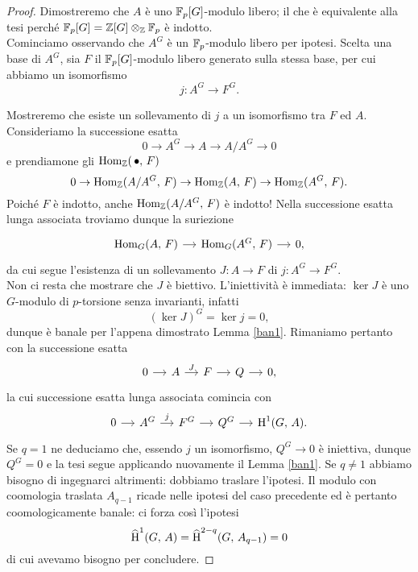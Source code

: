 \begin{proof}
	Dimostreremo che $ A $ è uno $ \mathbb{F}_p[G] $-modulo libero; il che è equivalente alla tesi perché $ \mathbb{F}_p[G] = \mathbb{Z}[G] \otimes_{\mathbb{Z}} \mathbb{F}_p $ è indotto. \\
	
	Cominciamo osservando che $ A^G $ è un $ \mathbb{F}_p $-modulo libero per ipotesi. Scelta una base di $ A^G $, sia $ F $ il $ \mathbb{F}_p[G] $-modulo libero generato sulla stessa base, per cui abbiamo un isomorfismo
	\[ j \colon A^G \to F^G. \]
	
	Mostreremo che esiste un sollevamento di $ j $ a un isomorfismo tra $ F $ ed $ A $. Consideriamo la successione esatta
	\[ 0 \to A^G \to A \to A/A^G \to 0 \]
	e prendiamone gli $ \operatorname{Hom}_{\mathbb{Z}}(\, \bullet, \, F) $
	\begin{equation}\label{homsucc1}
		0 \to \operatorname{Hom}_{\mathbb{Z}}(A/A^G, \, F) \to \operatorname{Hom}_{\mathbb{Z}}(A, \, F) \to \operatorname{Hom}_{\mathbb{Z}}(A^G, \, F).
	\end{equation}
	Poiché $ F $ è indotto, anche $ \operatorname{Hom}_{\mathbb{Z}}(A/A^G, \, F) $ è indotto! Nella successione esatta lunga associata troviamo dunque la suriezione
	\[ \begin{tikzcd}[column sep = small]
	\Hom_G(A, \, F) \rar & \Hom_G(A^G, \, F) \rar & 0,
	\end{tikzcd}\]
	da cui segue l'esistenza di un sollevamento $ J \colon A \to F $ di $ j \colon A^G \to F^G. $ \\
	
	Non ci resta che mostrare che $ J $ è biettivo. L'iniettività è immediata: $ \ker J $ è uno $ G $-modulo di $ p $-torsione senza invarianti, infatti
	\[ (\ker J)^G = \ker j = 0, \]
	dunque è banale per l'appena dimostrato Lemma \ref{ban1}. Rimaniamo pertanto con la successione esatta
	\[ \begin{tikzcd}[column sep = small]
	0 \rar& A \rar["J"]& F \rar& Q \rar& 0,
	\end{tikzcd} \]
	la cui successione esatta lunga associata comincia con
	\[ \begin{tikzcd}[column sep = small]
	0 \rar & A^G \rar["j"] & F^G \rar & Q^G \rar & \HH^1(G, \, A).
	\end{tikzcd} \]
	Se $ q = 1 $ ne deduciamo che, essendo $ j $ un isomorfismo, $ Q^G \to 0 $ è iniettiva, dunque $ Q^G = 0 $ e la tesi segue applicando nuovamente il Lemma \ref{ban1}. Se $ q \neq 1 $ abbiamo bisogno di ingegnarci altrimenti: dobbiamo traslare l'ipotesi. Il modulo con coomologia traslata $ A_{q-1} $ ricade nelle ipotesi del caso precedente ed è pertanto coomologicamente banale: ci forza così l'ipotesi 
	\[ \operatorname{\widehat{H}}^1(G, \, A) = \operatorname{\widehat{H}}^{2-q}(G, \, A_{q-1}) = 0 \]
	di cui avevamo bisogno per concludere.
\end{proof}

